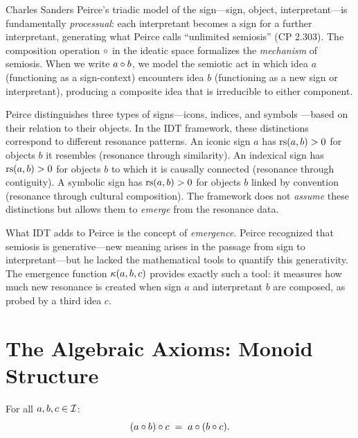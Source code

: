 \begin{interpretation}\label{interp:ch1:peirce_semiosis}
Charles Sanders Peirce's triadic model of the sign---sign, object,
interpretant---is fundamentally \emph{processual}: each interpretant
becomes a sign for a further interpretant, generating what Peirce calls
``unlimited semiosis'' (CP 2.303). The composition operation $\circ$
in the ideatic space formalizes the \emph{mechanism} of semiosis. When
we write $a \circ b$, we model the semiotic act in which idea $a$
(functioning as a sign-context) encounters idea $b$ (functioning as a
new sign or interpretant), producing a composite idea that is irreducible
to either component.

Peirce distinguishes three types of signs---icons, indices, and symbols
---based on their relation to their objects. In the IDT framework, these
distinctions correspond to different resonance patterns. An iconic sign
$a$ has $\mathrm{rs}(a, b) > 0$ for objects $b$ it resembles (resonance through
similarity). An indexical sign has $\mathrm{rs}(a, b) > 0$ for objects $b$ to which
it is causally connected (resonance through contiguity). A symbolic sign
has $\mathrm{rs}(a, b) > 0$ for objects $b$ linked by convention (resonance through
cultural composition). The framework does not \emph{assume} these
distinctions but allows them to \emph{emerge} from the resonance data.

What IDT adds to Peirce is the concept of \emph{emergence}. Peirce
recognized that semiosis is generative---new meaning arises in the passage
from sign to interpretant---but he lacked the mathematical tools to
quantify this generativity. The emergence function $\kappa(a, b, c)$
provides exactly such a tool: it measures how much new resonance is created
when sign $a$ and interpretant $b$ are composed, as probed by a third
idea $c$.
\end{interpretation}

\section{The Algebraic Axioms: Monoid Structure}

\begin{axiom_def}
For all $a, b, c \in \mathcal{I}$:
\[
    (a \circ b) \circ c \;=\; a \circ (b \circ c).
\]
\end{axiom_def}

